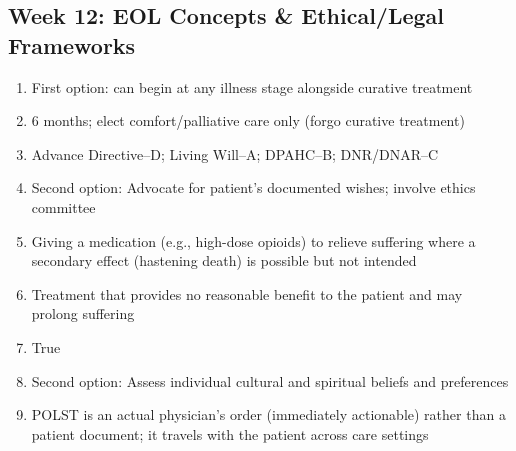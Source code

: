 \documentclass[11pt,letterpaper]{article}
\begin{document}
\begin{keybox}
\subsection*{Week 12: EOL Concepts \& Ethical/Legal Frameworks}
\begin{enumerate}[leftmargin=1.5em,label=\textbf{\arabic*.},start=141]
  \item First option: can begin at any illness stage alongside curative treatment
  \item 6 months; elect comfort/palliative care only (forgo curative treatment)
  \item Advance Directive--D; Living Will--A; DPAHC--B; DNR/DNAR--C
  \item Second option: Advocate for patient's documented wishes; involve ethics committee
  \item Giving a medication (e.g., high-dose opioids) to relieve suffering where a secondary
        effect (hastening death) is possible but not intended
  \item Treatment that provides no reasonable benefit to the patient and may prolong suffering
  \item True
  \item Second option: Assess individual cultural and spiritual beliefs and preferences
  \item POLST is an actual physician's order (immediately actionable) rather than a patient
        document; it travels with the patient across care settings
\end{enumerate}

\hrulefill

\end{keybox}
\end{document}
